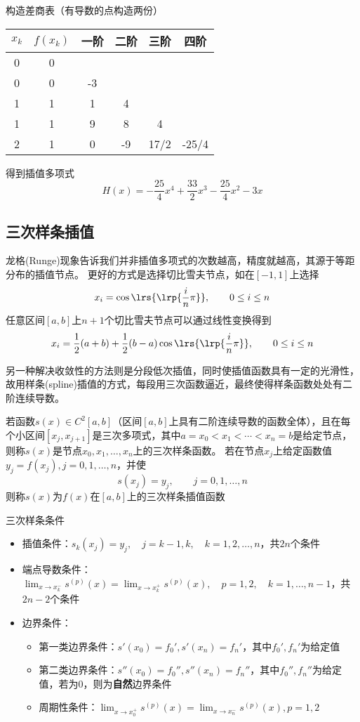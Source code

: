 \begin{analysis}
    构造差商表（有导数的点构造两份）
    \begin{center}
        \begin{tabular}{cccccc}\hline
            $x_k$ & $f(x_k)$ & 一阶 & 二阶 & 三阶 & 四阶\\\hline
            0 & 0\\
            0 & 0 & -3\\
            1 & 1 & 1 & 4\\
            1 & 1 & 9 & 8 & 4\\
            2 & 1 & 0 & -9 & 17/2 & -25/4\\\hline
        \end{tabular}
    \end{center}
    得到插值多项式
    \[H(x)=-\frac{25}{4}x^4+\frac{33}{2}x^3-\frac{25}{4}x^2-3x\]
\end{analysis}

\subsection{三次样条插值}
龙格(Runge)现象告诉我们并非插值多项式的次数越高，精度就越高，其源于等距分布的插值节点。
更好的方式是选择切比雪夫节点，如在$[-1,1]$上选择
\[x_i=\cos\lrs{\lrp{\frac{i}{n}\pi}},\qquad 0\leq i\leq n\]
任意区间$[a,b]$上$n+1$个切比雪夫节点可以通过线性变换得到
\[x_i=\frac{1}{2}(a+b)+\frac{1}{2}(b-a)\cos\lrs{\lrp{\frac{i}{n}\pi}},\qquad 0\leq i\leq n\]

另一种解决收敛性的方法则是分段低次插值，同时使插值函数具有一定的光滑性，故用样条(spline)插值的方式，每段用三次函数逼近，最终使得样条函数处处有二阶连续导数。
\begin{definition}[三次样条函数]
    若函数$s(x)\in C^2[a,b]$（区间$[a,b]$上具有二阶连续导数的函数全体），且在每个小区间$[x_j,x_{j+1}]$是三次多项式，其中$a=x_0<x_1<\cdots<x_n=b$是给定节点，则称$s(x)$是节点$x_0,x_1,\ldots,x_n$上的三次样条函数。
    若在节点$x_j$上给定函数值$y_j=f(x_j),j=0,1,\ldots,n$，并使
    \[s(x_j)=y_j,\qquad j=0,1,\ldots,n\]
    则称$s(x)$为$f(x)$在$[a,b]$上的三次样条插值函数
\end{definition}

三次样条条件
\begin{itemize}
    \item 插值条件：$s_k(x_j)=y_j,\quad j=k-1,k,\quad k=1,2,\ldots,n$，共$2n$个条件
    \item 端点导数条件：$\lim_{x\to x_k^-}s^{(p)}(x)=\lim_{x\to x^+_k}s^{(p)}(x),\quad p=1,2,\quad k=1,\ldots,n-1$，共$2n-2$个条件
    \item 边界条件：
    \begin{itemize}
        \item 第一类边界条件：$s'(x_0)=f_0',s'(x_n)=f_n'$，其中$f_0',f_n'$为给定值
        \item 第二类边界条件：$s''(x_0)=f_0'',s''(x_n)=f_n''$，其中$f_0'',f_n''$为给定值，若为$0$，则为\textbf{自然}边界条件
        \item 周期性条件：$\lim_{x\to x_0^+}s^{(p)}(x)=\lim_{x\to x_n^-}s^{(p)}(x),p=1,2$
    \end{itemize}
\end{itemize}

